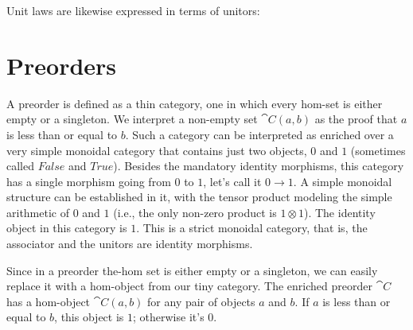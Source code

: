 \noindent
Unit laws are likewise expressed in terms of unitors:

\begin{figure}[H]
  \centering
  \begin{subfigure}
    \centering
  \end{subfigure}
  \hspace{1cm}
  \begin{subfigure}
    \centering
  \end{subfigure}
\end{figure}

\section{Preorders}

A preorder is defined as a thin category, one in which every hom-set is
either empty or a singleton. We interpret a non-empty set
$\cat{C}(a, b)$ as the proof that $a$ is less than or equal to
$b$. Such a category can be interpreted as enriched over a very
simple monoidal category that contains just two objects, $0$ and $1$
(sometimes called $False$ and $True$). Besides the mandatory identity
morphisms, this category has a single morphism going from $0$ to $1$, let's
call it $0 \to 1$. A simple monoidal structure can be
established in it, with the tensor product modeling the simple
arithmetic of $0$ and $1$ (i.e., the only non-zero product is $1 \otimes 1$).
The identity object in this category is $1$. This is a strict monoidal
category, that is, the associator and the unitors are identity
morphisms.

Since in a preorder the-hom set is either empty or a singleton, we can
easily replace it with a hom-object from our tiny category. The enriched
preorder $\cat{C}$ has a hom-object $\cat{C}(a, b)$ for any pair of
objects $a$ and $b$. If $a$ is less than or equal
to $b$, this object is $1$; otherwise it's $0$.

